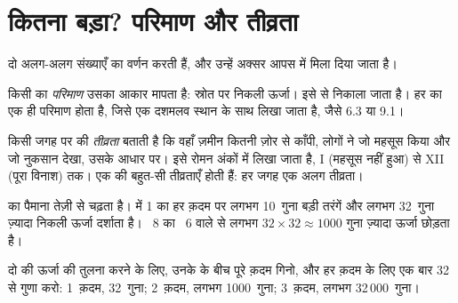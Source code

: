 \section{कितना बड़ा? परिमाण और तीव्रता}

दो अलग-अलग संख्याएँ  का वर्णन करती हैं, और उन्हें अक्सर आपस में मिला दिया जाता है।

\begin{definition}[परिमाण]\label{def:g7:earthquakes:magnitude}
किसी  का \emph{परिमाण} उसका आकार मापता है: स्रोत पर निकली
ऊर्जा। इसे  से निकाला जाता है। हर  का एक ही परिमाण होता है, जिसे
एक दशमलव स्थान के साथ लिखा जाता है, जैसे
6.3 या 9.1।
\end{definition}

\begin{definition}[तीव्रता]\label{def:g7:earthquakes:intensity}
किसी जगह पर  की \emph{तीव्रता} बताती है कि वहाँ ज़मीन कितनी
ज़ोर से काँपी, लोगों ने जो महसूस किया और जो नुकसान देखा, उसके आधार पर। इसे रोमन
अंकों में लिखा जाता है, I (महसूस नहीं हुआ) से XII (पूरा विनाश) तक। एक  की
बहुत-सी तीव्रताएँ होती हैं: हर जगह एक अलग
तीव्रता।
\end{definition}

 का पैमाना तेज़ी से चढ़ता है।  में 1 का हर क़दम  पर लगभग
10~गुना बड़ी तरंगें और लगभग 32~गुना ज़्यादा निकली ऊर्जा दर्शाता है। ~8 का
 ~6 वाले से लगभग
$32 \times 32 \approx 1000$ गुना ज़्यादा ऊर्जा छोड़ता है।

\begin{method}[दो परिमाणों की तुलना]\label{met:g7:earthquakes:magnitudes}
दो  की ऊर्जा की तुलना करने के लिए, उनके  के बीच पूरे क़दम गिनो, और
हर क़दम के लिए एक बार 32 से गुणा करो: 1~क़दम, 32~गुना; 2~क़दम, लगभग
1000~गुना; 3~क़दम, लगभग 32\,000~गुना।
\end{method}

